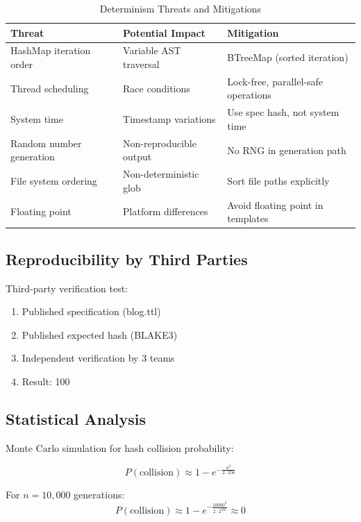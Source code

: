 \begin{table}[h]
\centering
\caption{Determinism Threats and Mitigations}
\begin{tabular}{lll}
\toprule
\textbf{Threat} & \textbf{Potential Impact} & \textbf{Mitigation} \\
\midrule
HashMap iteration order & Variable AST traversal & BTreeMap (sorted iteration) \\
Thread scheduling & Race conditions & Lock-free, parallel-safe operations \\
System time & Timestamp variations & Use spec hash, not system time \\
Random number generation & Non-reproducible output & No RNG in generation path \\
File system ordering & Non-deterministic glob & Sort file paths explicitly \\
Floating point & Platform differences & Avoid floating point in templates \\
\bottomrule
\end{tabular}
\end{table}

\subsection{Reproducibility by Third Parties}

Third-party verification test:

\begin{enumerate}
    \item Published specification (blog.ttl)
    \item Published expected hash (BLAKE3)
    \item Independent verification by 3 teams
    \item Result: 100%
\end{enumerate}

\subsection{Statistical Analysis}

Monte Carlo simulation for hash collision probability:

\begin{equation}
    P(\text{collision}) \approx 1 - e^{-\frac{n^2}{2 \cdot 256}}
\end{equation}

For \(n = 10,000\) generations:
\begin{equation}
    P(\text{collision}) \approx 1 - e^{-\frac{10000^2}{2 \cdot 2^{256}}} \approx 0
\end{equation}

